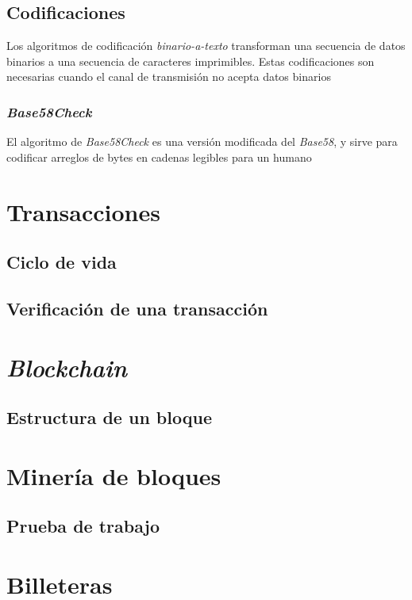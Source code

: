 \subsection{Codificaciones}

Los algoritmos de codificación \emph{binario-a-texto} transforman una secuencia de datos binarios a una secuencia de caracteres imprimibles. Estas codificaciones son necesarias cuando el canal de transmisión no acepta datos binarios \autocite{WikipediaEncoding} 

\subsubsection{\emph{Base58Check}}

El algoritmo de \emph{Base58Check} es una versión modificada del \emph{Base58}, y sirve para codificar arreglos de bytes en cadenas legibles para un humano \autocite{WikipediaBase58Check}  

\section{Transacciones}
\subsection{Ciclo de vida}
\subsection{Verificación de una transacción}

\section{\emph{Blockchain}}
\subsection{Estructura de un bloque}

\section{Minería de bloques}
\subsection{Prueba de trabajo}

\section{Billeteras}






\clearpage
\printbibliography


